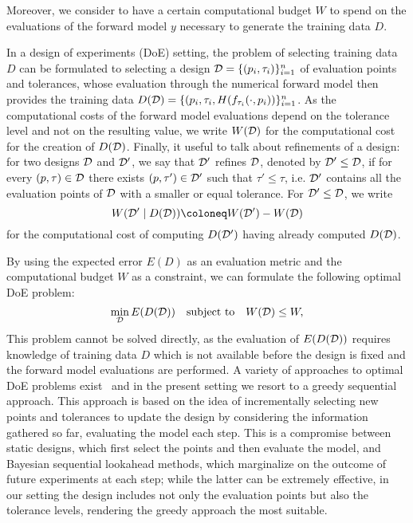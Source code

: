 Moreover, we consider to have a certain computational budget $W$ to spend on the evaluations of the forward model $y$ necessary to generate the training data $D$. \medbreak 

In a design of experiments (DoE) setting, the problem of selecting training data $D$ can be formulated to selecting a design $\mathcal D = \{ (p_i, \tau_i) \}_{i=1}^n$ of evaluation points and tolerances, whose evaluation through the numerical forward model then provides the training data $D(\mathcal D) = \{ (p_i, \tau_i, H(f_{\tau_i}(\cdot, p_i)) \}_{i=1}^n$. \newline
As the computational costs of the forward model evaluations depend on the tolerance level and not on the resulting value, we write $W(\mathcal D)$ for the computational cost for the creation of $D(\mathcal D)$. \newline
Finally, it useful to talk about refinements of a design: for two designs $\mathcal D$ and $\mathcal D'$, we say that $\mathcal D'$ refines $\mathcal D$, denoted by $\mathcal D' \leq \mathcal D$, if for every $(p, \tau) \in \mathcal D$ there exists $(p, \tau') \in \mathcal D'$ such that $\tau' \leq \tau$, i.e.  $\mathcal D'$ contains all the evaluation points of $\mathcal D$ with a smaller or equal tolerance.
For $\mathcal D' \leq \mathcal D$, we write 
\[ 
W(\mc D' \mid D(\mc D)) \coloneq W(\mc D') - W(\mc D)
\] for the computational cost of computing $D(\mathcal D')$ having already computed $D(\mathcal D)$. \medbreak

By using the expected error $E(D)$ as an evaluation metric and the computational budget $W$ as a constraint, we can formulate the following optimal DoE problem:
\begin{equation} \label{prob:doe}
    \min_{\mathcal D} E(D(\mathcal D)) \quad \text{subject to} \quad W(\mathcal D) \le W,
\end{equation}
This problem cannot be solved directly, as the evaluation of $E(D(\mathcal D))$ requires knowledge of training data $D$ which is not available before the design is fixed and the forward model evaluations are performed.
A variety of approaches to optimal DoE problems exist~\cite{HuanJagalurMarzouk2024} and in the present setting we resort to a greedy sequential approach. 
This approach is based on the idea of incrementally selecting new points and tolerances to update the design by considering the information gathered so far, evaluating the model each step. \newline
This is a compromise between static designs, which first select the points and then evaluate the model, and Bayesian sequential lookahead methods, which marginalize on the outcome of future experiments at each step; while the latter can be extremely effective, in our setting the design includes not only the evaluation points but also the tolerance levels, rendering the greedy approach the most suitable. \medbreak

